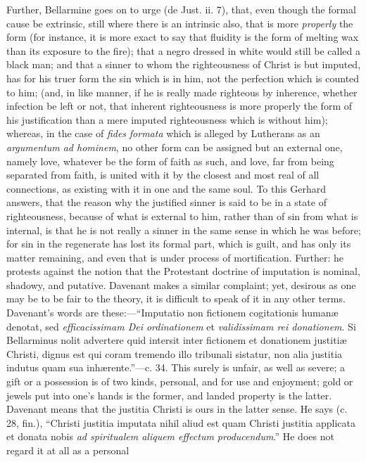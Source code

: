 Further, Bellarmine goes on to urge (de Just. ii. 7), that, even
though the formal cause be extrinsic, still where there is an
intrinsic also, that is more \emph{properly} the form (for instance,
it is more exact to say that fluidity is the form of melting wax than
its exposure to the fire); that a negro dressed in white would still
be called a black man; and that a sinner to whom the righteousness of
Christ is but imputed, has for his truer form the sin which is in him,
not the perfection which is counted to him; (and, in like manner, if
he is really made righteous by inherence, whether infection be left or
not, that inherent righteousness is more properly the form of his
justification than a mere imputed righteousness which is without him);
whereas, in the case of \emph{fides} \emph{formata} which is
alleged by Lutherans as an \emph{argumentum ad hominem}, no other form
can be assigned but an external one, namely love, whatever be the form
of faith as such, and love, far from being separated from faith, is
united with it by the closest and most real of all connections, as
existing with it in one and the same soul. To this Gerhard answers,
that the reason why the justified sinner is said to be in a state of
righteousness, because of what is external to him, rather than of sin
from what is internal, is that he is not really a sinner in the same
sense in which he was before; for sin in the regenerate has lost its
formal part, which is guilt, and has only its matter remaining, and
even that is under process of mortification. Further: he protests
against the notion that the Protestant doctrine of imputation is
nominal, shadowy, and putative. Davenant makes a similar complaint;
yet, desirous as one may be to be fair to the theory, it is difficult
to speak of it in any other terms. Davenant's words are these:—``Imputatio
non fictionem cogitationis humanæ denotat, sed \emph{efficacissimam Dei
ordinationem} et \emph{validissimam rei donationem}. Si Bellarminus
nolit advertere quid intersit inter fictionem et donationem justitiæ
Christi, dignus est qui coram tremendo illo tribunali sistatur, non
alia justitia indutus quam sua inhærente.''—c. 34. This surely
is unfair, as well as severe; a gift or a possession is of two kinds,
personal, and for use and enjoyment; gold or jewels put into one's
hands is the former, and landed property is the latter. Davenant means
that the justitia Christi is ours in the latter sense. He says (c. 28,
fin.), ``Christi justitia imputata nihil aliud est quam Christi
justitia applicata et donata nobis \emph{ad spiritualem aliquem effectum
producendum}.'' He does not regard it at all as a personal
